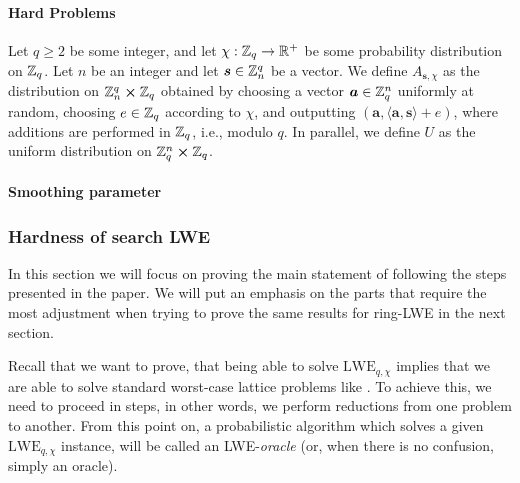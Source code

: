 \paragraph{Hard Problems}
\begin{definition}
\end{definition}
\begin{definition}
\end{definition}
\begin{definition}\label{lwe-distr}
    Let $q \geq 2$ be some integer, and let $\chi : \mathbb{Z}_q \rightarrow \mathbb{R}^+$ be some probability distribution on $\mathbb{Z}_q$. Let $n$ be an integer and let $\boldsymbol{s} \in \mathbb{Z}_n^q$ be a vector. We define $A_{\bm{s},\chi}$ as the distribution on $\mathbb{Z}_n^q \cross \mathbb{Z}_q$ obtained by choosing a vector $\boldsymbol{a} \in \mathbb{Z}_q^n$ uniformly at random, choosing $e \in \mathbb{Z}_q$ according to $\chi$, and outputting $(\bm{a}, \langle \bm{a}, \bm{s} \rangle + e)$, where additions are performed in $\mathbb{Z}_q$, i.e., modulo $q$. In parallel, we define $U$ as the uniform distribution on $\mathbb{Z}_q^n \cross \mathbb{Z}_q$.
\end{definition}
\begin{definition}\label{dgs}
\end{definition}
\paragraph{Smoothing parameter}

\subsubsection{Hardness of search LWE}
In this section we will focus on proving the main statement of \cite{regev} following the steps presented in the paper. We will put an emphasis on the parts that require the most adjustment when trying to prove the same results for ring-LWE in the next section.

Recall that we want to prove, that being able to solve $\text{LWE}_{q, \chi}$ implies that we are able to solve standard worst-case lattice problems like . To achieve this, we need to proceed in steps, in other words, we perform reductions from one problem to another. From this point on, a probabilistic algorithm which solves a given $\text{LWE}_{q, \chi}$ instance, will be called an LWE-\textit{oracle} (or, when there is no confusion, simply an oracle).

